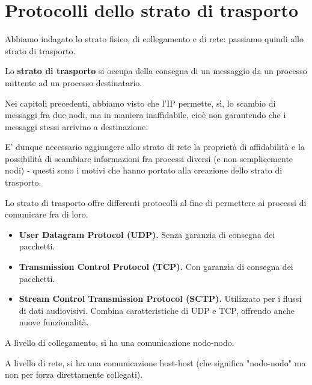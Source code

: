 \section{Protocolli dello strato di trasporto}
    Abbiamo indagato lo strato fisico, di collegamento e di rete: passiamo quindi allo strato di trasporto.
    
    \vspace{3mm}
    
    Lo \textbf{strato di trasporto} si occupa della consegna di un messaggio da un processo mittente ad un processo destinatario. 
    
    \vspace{3mm}
    
    Nei capitoli precedenti, abbiamo visto che l'IP permette, sì, lo scambio di messaggi fra due nodi, ma in maniera inaffidabile, cioè non garantendo che i messaggi stessi arrivino a destinazione. 
    
    E' dunque necessario aggiungere allo strato di rete la proprietà di affidabilità e la possibilità di scambiare informazioni fra processi diversi (e non semplicemente nodi) - questi sono i motivi che hanno portato alla creazione dello strato di trasporto.
   
    \vspace{3mm}
   
    Lo strato di trasporto offre differenti protocolli al fine di permettere ai processi di comunicare fra di loro.
   
    \begin{itemize}
        \item 
            \textbf{User Datagram Protocol (UDP).} Senza garanzia di consegna dei pacchetti.
            
        \item
           \textbf{Transmission Control Protocol (TCP).} Con garanzia di consegna dei pacchetti.
            
        \item
            \textbf{Stream Control Transmission Protocol (SCTP).} Utilizzato per i flussi di dati audiovisivi. Combina caratteristiche di UDP e TCP, offrendo anche nuove funzionalità.
    \end{itemize}
   
    A livello di collegamento, si ha una comunicazione nodo-nodo.
   
    A livello di rete, si ha una comunicazione host-host (che significa "nodo-nodo" ma non per forza direttamente collegati).
   
